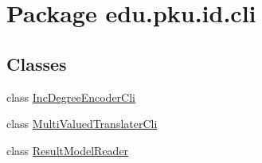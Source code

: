 \hypertarget{namespaceedu_1_1pku_1_1id_1_1cli}{
\section{Package edu.pku.id.cli}
\label{namespaceedu_1_1pku_1_1id_1_1cli}
}
\subsection*{Classes}
\begin{DoxyCompactItemize}
\item 
class \hyperlink{classedu_1_1pku_1_1id_1_1cli_1_1_inc_degree_encoder_cli}{IncDegreeEncoderCli}
\item 
class \hyperlink{classedu_1_1pku_1_1id_1_1cli_1_1_multi_valued_translater_cli}{MultiValuedTranslaterCli}
\item 
class \hyperlink{classedu_1_1pku_1_1id_1_1cli_1_1_result_model_reader}{ResultModelReader}
\end{DoxyCompactItemize}
